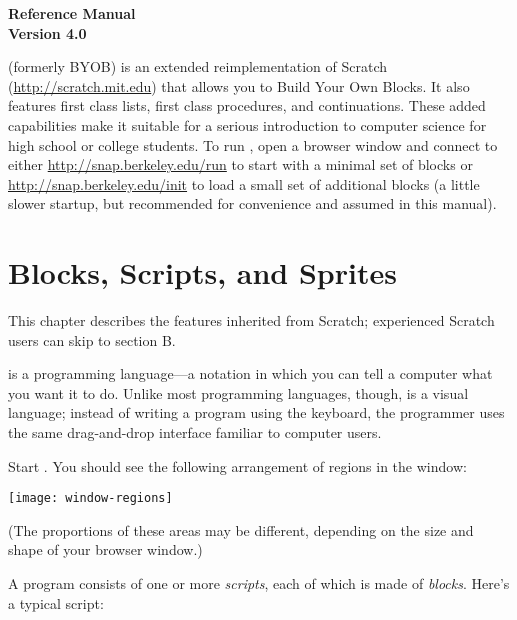 \documentclass{report}
\begin{document}
\begin{titlepage}

\begin{center}
\bf \Huge \Snap{} Reference Manual \\ \huge Version 4.0 \vspace{40pt}
\end{center}

\Snap{} (formerly BYOB) is an extended reimplementation of Scratch (\url{http://scratch.mit.edu}) that allows you to Build Your Own Blocks. It also features first class lists, first class procedures, and continuations. These added capabilities make it suitable for a serious introduction to computer science for high school or college students.  To run \Snap{}, open a browser window and connect to either \url{http://snap.berkeley.edu/run} to start with a minimal set of blocks or \url{http://snap.berkeley.edu/init} to load a small set of additional blocks (a little slower startup, but recommended for convenience and assumed in this manual).

\end{titlepage}

\chapter{Blocks, Scripts, and Sprites}

This chapter describes the \Snap{} features inherited from Scratch; experienced Scratch users can skip to section B.

\Snap{} is a programming language---a notation in which you can tell a computer what you want it to do. Unlike most programming languages, though, \Snap{} is a visual language; instead of writing a program using the keyboard, the \Snap{} programmer uses the same drag-and-drop interface familiar to computer users.

Start \Snap{}. You should see the following arrangement of regions in the window:

\begin{center}
\texttt{[image: window-regions]}
\end{center}

(The proportions of these areas may be different, depending on the size and shape of your browser window.)

A \Snap{} program consists of one or more \emph{scripts}, each of which is made of \emph{blocks}. Here's a typical script:

\end{document}

